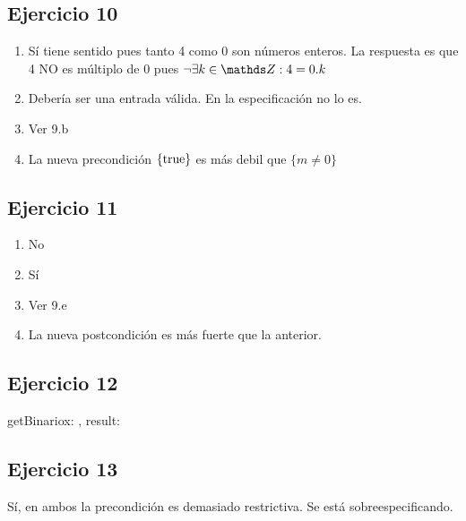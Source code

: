 \subsection{Ejercicio 10}
\begin{enumerate}[label=(\alph*)]
    \item Sí tiene sentido pues tanto 4 como 0 son números enteros. La respuesta es que 4 NO es múltiplo de 0 pues
    $ \neg \exists k \in \ent : 4 = 0.k$
    \item Debería ser una entrada válida. En la especificación no lo es.
    \item Ver 9.b
    \item La nueva precondición $\{\mathrm{true}\}$ es más debil que $\{ m \neq 0\}$
\end{enumerate}

\subsection{Ejercicio 11}
\begin{enumerate}[label=(\alph*)]
    \item No
    \item Sí
    \item Ver 9.e
    \item La nueva postcondición es más fuerte que la anterior.
\end{enumerate}

\subsection{Ejercicio 12}
\begin{proc}{getBinario}{\In x: \ent, \Out result: \TLista{\ent}}{}
\end{proc}

\subsection{Ejercicio 13}
Sí, en ambos la precondición es demasiado restrictiva. Se está sobreespecificando.

